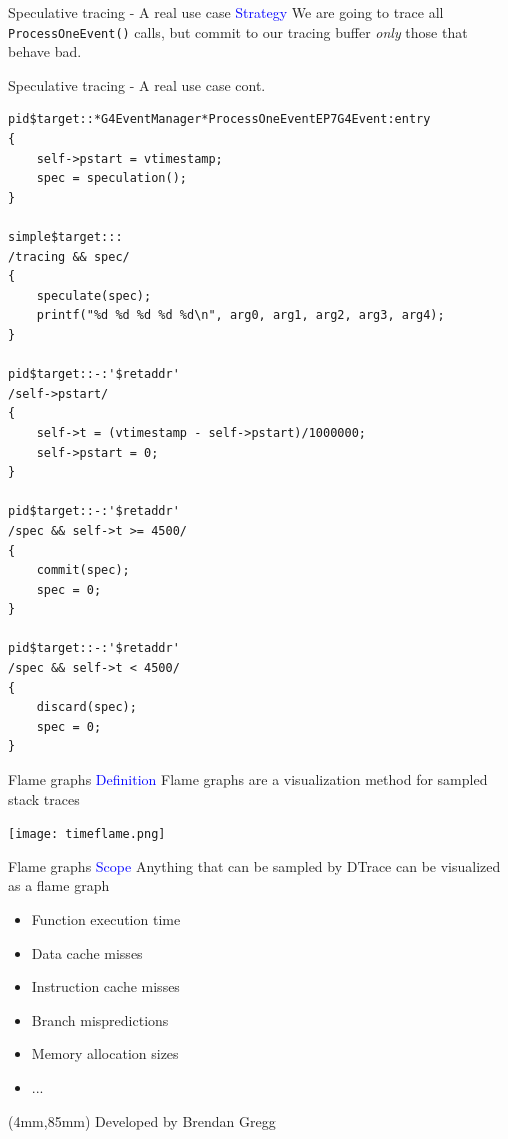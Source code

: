 \documentclass{beamer}
\newenvironment{reference}[2]{%
  \begin{textblock*}{\textwidth}(#1,#2) 
      \tiny\bgroup\color{red!50!black}}{\egroup\end{textblock*}}
\begin{document}
\begin{frame}{Speculative tracing - A real use case}
\textcolor{blue}{Strategy} We are going to trace all {\tt ProcessOneEvent()} calls, but commit to our tracing
buffer \textit{only} those that behave bad.
\end{frame}

\begin{frame}[fragile]{Speculative tracing - A real use case cont.}
\lstset{basicstyle=\tiny\ttfamily}
\lstset{frame=single, columns=flexible}
\begin{lstlisting}
pid$target::*G4EventManager*ProcessOneEventEP7G4Event:entry
{
    self->pstart = vtimestamp;
    spec = speculation();
}

simple$target:::
/tracing && spec/
{
    speculate(spec);
    printf("%d %d %d %d %d\n", arg0, arg1, arg2, arg3, arg4);
}

pid$target::-:'$retaddr'
/self->pstart/
{
    self->t = (vtimestamp - self->pstart)/1000000;
    self->pstart = 0;
}

pid$target::-:'$retaddr'
/spec && self->t >= 4500/
{
    commit(spec);
    spec = 0;
}

pid$target::-:'$retaddr'
/spec && self->t < 4500/
{
    discard(spec);
    spec = 0;
}
\end{lstlisting}
\end{frame}

\begin{frame}{Flame graphs}
\textcolor{blue}{Definition} Flame graphs are a visualization method for sampled stack traces

\begin{center}
  \texttt{[image: timeflame.png]}
\end{center}
\end{frame}

\begin{frame}{Flame graphs}
\textcolor{blue}{Scope} Anything that can be sampled by DTrace can be visualized as a flame graph
\begin{itemize}
\item Function execution time
\item Data cache misses
\item Instruction cache misses
\item Branch mispredictions
\item Memory allocation sizes
\item ...
\end{itemize}

\begin{reference}{4mm}{85mm}
Developed by Brendan Gregg
\end{reference}
\end{frame}
\end{document}
